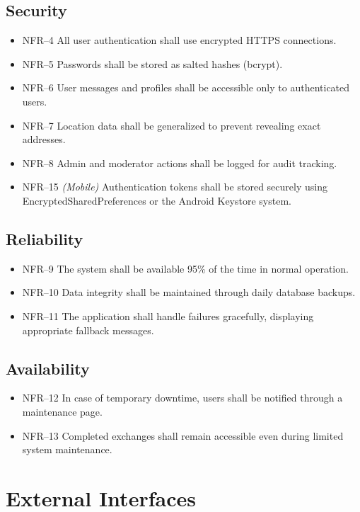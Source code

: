 \documentclass[11pt,a4paper]{report}
\begin{document}
\subsection{Security}
\begin{itemize}
    \item NFR--4 All user authentication shall use encrypted HTTPS connections.
    \item NFR--5 Passwords shall be stored as salted hashes (bcrypt).
    \item NFR--6 User messages and profiles shall be accessible only to authenticated users.
    \item NFR--7 Location data shall be generalized to prevent revealing exact addresses.
    \item NFR--8 Admin and moderator actions shall be logged for audit tracking.
    \item NFR--15 \textit{(Mobile)} Authentication tokens shall be stored securely using EncryptedSharedPreferences or the Android Keystore system.
\end{itemize}

\subsection{Reliability}
\begin{itemize}
    \item NFR--9 The system shall be available 95\% of the time in normal operation.
    \item NFR--10 Data integrity shall be maintained through daily database backups.
    \item NFR--11 The application shall handle failures gracefully, displaying appropriate fallback messages.
\end{itemize}

\subsection{Availability}
\begin{itemize}
    \item NFR--12 In case of temporary downtime, users shall be notified through a maintenance page.
    \item NFR--13 Completed exchanges shall remain accessible even during limited system maintenance.
\end{itemize}

\section{External Interfaces}
\label{sec:external-interfaces}
\end{document}
